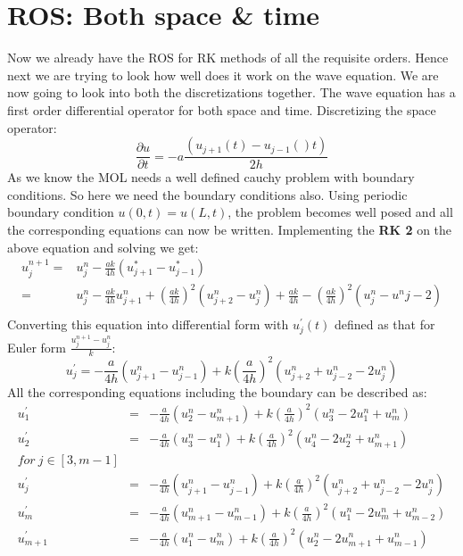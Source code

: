 \documentclass[a4paper,12pt]{report}
\begin{document}
\section{ROS: Both space \& time}
Now we already have the ROS for RK methods of all the requisite orders. Hence next we are trying to look how well does it work on the wave equation. We are now going to look into both the discretizations together. The wave equation has a first order differential operator for both space and time. Discretizing the space operator:
\[\frac{\partial u}{\partial t}= -a\frac{(u_{j+1}(t)-u_{j-1}()t)}{2h}\]
As we know the MOL needs a well defined cauchy problem with boundary conditions. So here we need the boundary conditions also. Using periodic boundary condition $u(0,t) = u(L,t)$, the problem becomes well posed and all the corresponding equations can now be written. Implementing the \textbf{RK 2} on the above equation and solving we get:
\begin{eqnarray}
u^{n+1}_{j}=&u^{n}_{j} -\frac{ak}{4h}(u^{*}_{j+1} -u^{*}_{j-1}) \nonumber \\
=& u^{n}_{j} - \frac{ak}{4h}u^{n}_{j+1}+(\frac{ak}{4h})^2(u^{n}_{j+2}-u^{n}_{j})+\frac{ak}{4h}-(\frac{ak}{4h})^2(u^{n}_{j}-u^{n}{j-2}) \nonumber \\
\end{eqnarray}
Converting this equation into differential form with $u^{\prime}_{j}(t)$ defined as that for Euler form $\frac{u^{n+1}_{j}-u^{n}_{j}}{k}$:
\[u^{\prime}_{j} = -\frac{a}{4h}(u^{n}_{j+1}-u^{n}_{j-1}) +k(\frac{a}{4h})^2(u^{n}_{j+2}+u^{n}_{j-2}-2u^{n}_{j})\]
All the corresponding equations including the boundary can be described as:
\begin{eqnarray}
u^{\prime}_{1} &=&  -\frac{a}{4h}(u^{n}_{2} - u^{n}_{m+1})+k(\frac{a}{4h})^2(u^{n}_{3}-2u^{n}_{1}+u^{n}_{m}) \nonumber \\
u^{\prime}_{2} &=&  -\frac{a}{4h}(u^{n}_{3} - u^{n}_{1})+k(\frac{a}{4h})^2(u^{n}_{4}-2u^{n}_{2}+u^{n}_{m+1}) \nonumber \\
for\ j\in[3,m-1] \nonumber \\
u^{\prime}_{j} &=& -\frac{a}{4h}(u^{n}_{j+1}-u^{n}_{j-1}) +k(\frac{a}{4h})^2(u^{n}_{j+2}+u^{n}_{j-2}-2u^{n}_{j}) \nonumber \\
u^{\prime}_{m} &=&  -\frac{a}{4h}(u^{n}_{m+1} - u^{n}_{m-1})+k(\frac{a}{4h})^2(u^{n}_{1}-2u^{n}_{m}+u^{n}_{m-2}) \nonumber \\
u^{\prime}_{m+1} &=&  -\frac{a}{4h}(u^{n}_{1} - u^{n}_{m})+k(\frac{a}{4h})^2(u^{n}_{2}-2u^{n}_{m+1}+u^{n}_{m-1}) \nonumber
\end{eqnarray}
\end{document}
